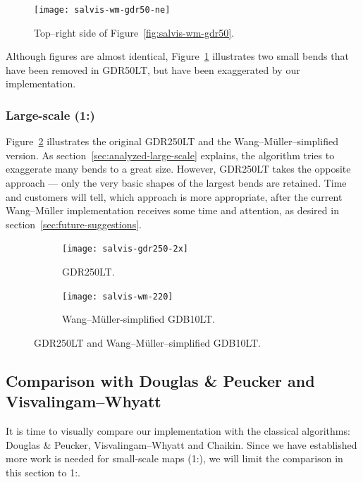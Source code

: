 \documentclass[a4paper]{article}
\newcommand{\DP}{Douglas \& Peucker}
\newcommand{\VW}{Visvalingam--Whyatt}
\newcommand{\WM}{Wang--M{\"u}ller}
\begin{document}
\begin{figure}[h!]
    \centering
    \texttt{[image: salvis-wm-gdr50-ne]}
    \caption{Top--right side of Figure~\ref{fig:salvis-wm-gdr50}.}
    \label{fig:salvis-wm-gdr50-ne}
\end{figure}

Although figures are almost identical, Figure~\ref{fig:salvis-wm-gdr50-ne}
illustrates two small bends that have been removed in GDR50LT, but have been
exaggerated by our implementation.

\subsubsection{Large-scale (1:)}
\label{sec:national-large-scale}

Figure~\ref{fig:salvis-wm-250k} illustrates the original GDR250LT and the
{\WM}--simplified version. As section~\ref{sec:analyzed-large-scale} explains,
the algorithm tries to exaggerate many bends to a great size. However, GDR250LT
takes the opposite approach --- only the very basic shapes of the largest bends
are retained. Time and customers will tell, which approach is more appropriate,
after the current {\WM} implementation receives some time and attention, as
desired in section~\ref{sec:future-suggestions}.

\begin{figure}[h!]
    \centering
    \begin{subfigure}[b]{.49\textwidth}
        \texttt{[image: salvis-gdr250-2x]}
        \caption{GDR250LT.}
    \end{subfigure}
    \hfill
    \begin{subfigure}[b]{.49\textwidth}
        \centering
        \texttt{[image: salvis-wm-220]}
        \caption{{\WM}-simplified GDB10LT.}
    \end{subfigure}
    \caption{GDR250LT and {\WM}--simplified GDB10LT.}
    \label{fig:salvis-wm-250k}
\end{figure}


\subsection{Comparison with {\DP} and {\VW}}

It is time to visually compare our implementation with the classical
algorithms: {\DP}, {\VW} and Chaikin. Since we have established more work is
needed for small-scale maps (1:), we will limit the comparison
in this section to 1:.
\end{document}

